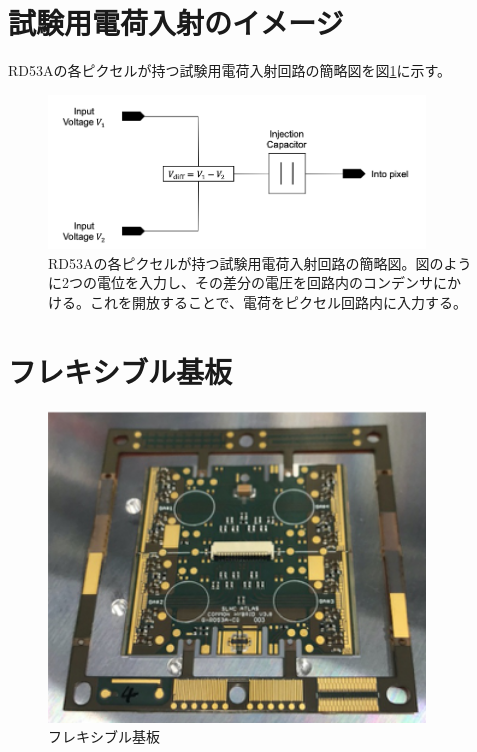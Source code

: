 \section{試験用電荷入射のイメージ}
RD53Aの各ピクセルが持つ試験用電荷入射回路の簡略図を図\ref{injection_circuit}に示す。
\begin{figure}[bpt]\centering
\includegraphics[width=10cm]{./injection_circuit.png}
\caption[RD53Aの各ピクセルが持つ試験用電荷入射回路の簡略図]{RD53Aの各ピクセルが持つ試験用電荷入射回路の簡略図\cite{b-1}。図のように2つの電位を入力し、その差分の電圧を回路内のコンデンサにかける。これを開放することで、電荷をピクセル回路内に入力する。}
\label{injection_circuit}
\end{figure}

\section{フレキシブル基板}
\begin{figure}[bpt]\centering
\includegraphics[width=10cm]{./pcb.png}
\caption[フレキシブル基板]{フレキシブル基板}
\label{pcb}
\end{figure}


